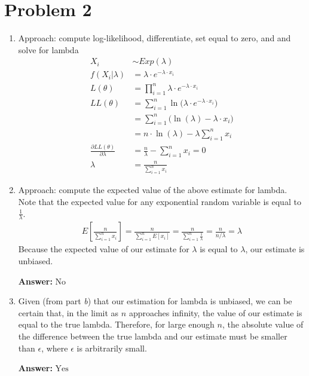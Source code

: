 \documentclass[12pt]{article}
\newcommand{\answer}[1]{\textbf{Answer:} $\boxed{#1}$}
\newcommand{\pd}{\\[2pt]}
\begin{document}
      \newpage
      \section*{Problem 2}
         \begin{enumerate}
            \item
               Approach: compute log-likelihood, differentiate, set
               equal to zero, and and solve for lambda
               \begin{align*}
                  X_i &\sim Exp(\lambda) \pd
                  f(X_i | \lambda) &= \lambda \cdot e^{-\lambda \cdot x_i} \pd
                  L(\theta) &=
                     \prod_{i = 1}^{n} \lambda \cdot e^{-\lambda \cdot x_i} \pd
                  LL(\theta) &= \sum_{i = 1}^{n}
                     \ln \big(\lambda \cdot e^{-\lambda \cdot x_i}\big) \pd
                  &= \sum_{i = 1}^{n} \big(\ln(\lambda) - \lambda \cdot x_i) \pd
                  &= n \cdot \ln(\lambda) - \lambda \sum_{i=1}^n{x_i} \pd
                  \frac{\partial LL(\theta)}{\partial \lambda} &=
                     \frac{n}{\lambda} - \sum_{i = 1}^{n}{x_i} = 0 \pd
                  \lambda &= \frac{n}{\sum_{i=1}^{n}{x_i}}
               \end{align*}
            \item
               Approach: compute the expected value of the above estimate for
               lambda. Note that the expected value for any exponential random
               variable is equal to $\frac{1}{\lambda}$.
               \begin{align*}
                  E\left[\frac{n}{\sum_{i=1}^{n}{x_i}}\right] =
                     \frac{n}{\sum\limits_{i=1}^{n}{E[x_i]}}
                  = \frac{n}{\sum\limits_{i=1}^{n}{\frac{1}{\lambda}}}
                  = \frac{n}{n/\lambda}
                  = \lambda
               \end{align*}
               Because the expected value of our estimate for $\lambda$ is equal
               to $\lambda$, our estimate is unbiased.

               \answer{\text{No}}
            \item
               Given (from part \emph{b}) that our estimation for lambda is
               unbiased, we can be certain that, in the limit as $n$ approaches
               infinity, the value of our estimate is equal to the true
               lambda. Therefore, for large enough $n$, the absolute value of
               the difference between the true lambda and our estimate must be
               smaller than $\epsilon$, where $\epsilon$ is arbitrarily small.

               \answer{\text{Yes}}
         \end{enumerate}
\end{document}
